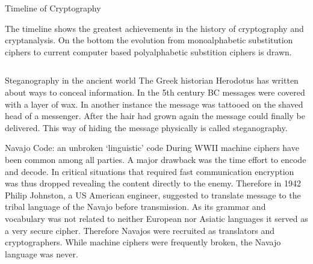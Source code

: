\documentclass[final,hyperref={pdfpagelabels=false}]{beamer}
\begin{document}
\begin{frame}{}
\begin{block}{\large Timeline of Cryptography}
\begin{figure}
      \end{figure}
      The timeline shows the greatest achievements in the history of cryptography and cryptanalysis. On the bottom the evolution from monoalphabetic substitution ciphers to current computer based polyalphabetic substition ciphers is drawn.
    \end{block}
    \vfill
    \begin{columns}[t]
      \begin{column}{.48\linewidth}
        \begin{block}{Steganography in the ancient world}
          The Greek historian Herodotus has written about ways to conceal information. In the 5th century BC messages were covered with a layer of wax. In another instance the message was tattooed on the shaved head of a messenger. After the hair had grown again the message could finally be delivered. This way of hiding the message physically is called steganography.
        \end{block}
        \begin{block}{Navajo Code: an unbroken `linguistic' code}
          During WWII machine ciphers have been common among all parties. A major drawback was the time effort to encode and decode. In critical situations that required fast communication encryption was thus dropped revealing the content directly to the enemy. Therefore in 1942 Philip Johnston, a US American engineer, suggested to translate message to the tribal language of the Navajo before transmission. As its grammar and vocabulary was not related to neither European nor Asiatic languages it served as a very secure cipher. Therefore Navajos were recruited as translators and cryptographers. While machine ciphers were frequently broken, the Navajo language was never.

\end{block}
\end{column}
\end{columns}
\end{frame}
\end{document}
